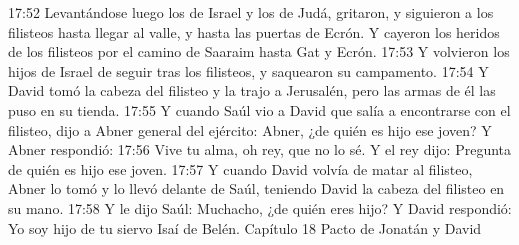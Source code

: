 17:52 Levantándose luego los de Israel y los de Judá, gritaron, y siguieron a los filisteos hasta llegar al valle, y hasta las puertas de Ecrón. Y cayeron los heridos de los filisteos por el camino de Saaraim hasta Gat y Ecrón.  
17:53 Y volvieron los hijos de Israel de seguir tras los filisteos, y saquearon su campamento. 
17:54 Y David tomó la cabeza del filisteo y la trajo a Jerusalén, pero las armas de él las puso en su tienda.  
17:55 Y cuando Saúl vio a David que salía a encontrarse con el filisteo, dijo a Abner general del ejército: Abner, ¿de quién es hijo ese joven? Y Abner respondió:  
17:56 Vive tu alma, oh rey, que no lo sé. Y el rey dijo: Pregunta de quién es hijo ese joven.  
17:57 Y cuando David volvía de matar al filisteo, Abner lo tomó y lo llevó delante de Saúl, teniendo David la cabeza del filisteo en su mano.  
17:58 Y le dijo Saúl: Muchacho, ¿de quién eres hijo? Y David respondió: Yo soy hijo de tu siervo Isaí de Belén.  
Capítulo 18
Pacto de Jonatán y David  

